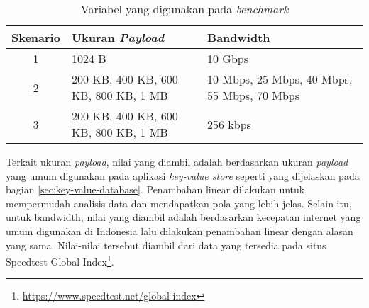 \begin{table}[ht]
  \centering
  \caption{Variabel yang digunakan pada \textit{benchmark}}
  \label{tab:variabel-benchmark}
  \begin{tabular}{|c|p{5.5cm}|p{5.5cm}|}
    \hline
    \textbf{Skenario} & \textbf{Ukuran \textit{Payload}} & \textbf{Bandwidth} \\ \hline
    1 & 1024 B & 10 Gbps \\ \hline
    2 & 200 KB, 400 KB, 600 KB, 800 KB, 1 MB & 10 Mbps, 25 Mbps, 40 Mbps, 55 Mbps, 70 Mbps \\ \hline
    3 & 200 KB, 400 KB, 600 KB, 800 KB, 1 MB & 256 kbps \\ \hline
  \end{tabular}
\end{table}

Terkait ukuran \textit{payload}, nilai yang diambil adalah berdasarkan ukuran \textit{payload} yang umum digunakan pada aplikasi \textit{key-value store} seperti yang dijelaskan pada bagian \ref{sec:key-value-database}. Penambahan linear dilakukan untuk mempermudah analisis data dan mendapatkan pola yang lebih jelas. Selain itu, untuk bandwidth, nilai yang diambil adalah berdasarkan kecepatan internet yang umum digunakan di Indonesia lalu dilakukan penambahan linear dengan alasan yang sama. Nilai-nilai tersebut diambil dari data yang tersedia pada situs Speedtest Global Index\footnote{\url{https://www.speedtest.net/global-index}}.